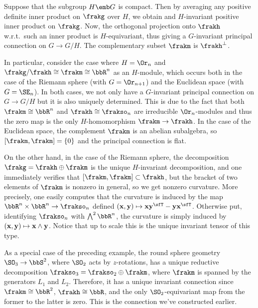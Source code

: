 \begin{example}\label{ex 1.4.6 Cap}
    Suppose that the subgroup $H\emb G$ is compact. Then by averaging any positive definite inner product on $\frakg$ over $H$, we obtain and $H$-invariant positive inner product on $\frakg$. Now, the orthogonal projection onto $\frakh$ w.r.t.\ such an inner product is $H$-equivariant, thus giving a $G$-invariant principal connection on $G\to G\slash H$. The complementary subset $\frakm$ is $\frakh^\perp$.

    In particular, consider the case where $H=\Or_n$ and $\frakg\slash\frakh\cong \frakm\cong \bbR^n$ as an $H$-module, which occurs both in the case of the Riemann sphere (with $G=\Or_{n+1}$) and the Euclidean space (with $G=\SE_n$). In both cases, we not only have a $G$-invariant principal connection on $G\to G\slash H$ but it is also uniquely determined. This is due to the fact that both $\frakm\cong\bbR^n$ and $\frakh\cong \frakso_n$ are irreducible $\Or_n$-modules and thus the zero map is the only $H$-homomorphism $\frakm\to \frakh$. In the case of the Euclidean space, the complement $\frakm$ is an abelian subalgebra, so $[\frakm,\frakm]=\{0\}$ and the principal connection is flat.

    On the other hand, in the case of the Riemann sphere, the decomposition $\frakg=\frakh\oplus\frakm$ is the unique $H$-invariant decomposition, and one immediately verifies that $[\frakm,\frakm]\subset\frakh$, but the bracket of two elements of $\frakm$ is nonzero in general, so we get nonzero curvature. More precisely, one easily computes that the curvature is induced by the map $\bbR^n\times\bbR^n\to \frakso_n$ defined $(\bf{x},\bf{y})\mapsto \bf{x}\bf{y}^\sfT -\bf{y}\bf{x}^\sfT $. Otherwise put, identifying $\frakso_n$ with $\bigwedge\nolimits^2\bbR^n$, the curvature is simply induced by $(\bf{x},\bf{y})\mapsto \bf{x}\wedge \bf{y}$. Notice that up to scale this is the unique invariant tensor of this type.
 \end{example}

 \begin{example}\label{ex round sphere 5}
    As a special case of the preceding example, the round sphere geometry $\SO_3\to \bbS^2$, where $\SO_2$ acts by $z$-rotations, has a unique reductive decomposition $\frakso_3=\frakso_2\oplus\frakm$, where $\frakm$ is spanned by the generators $L_1$ and $L_2$. Therefore, it has a unique invariant connection since $\frakm\cong \bbR^2$, $\frakh\cong \bbR$, and the only $\SO_2$-equivariant map from the former to the latter is zero. This is the connection we've constructed earlier.
\end{example}


